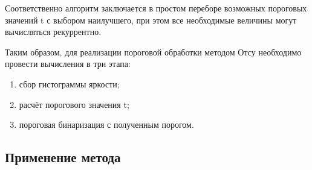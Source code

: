 \documentclass[12pt,a4paper]{extarticle} %
\begin{document}
    Соответственно алгоритм заключается в простом переборе возможных пороговых значений t с выбором наилучшего, при этом все необходимые величины могут вычисляться рекуррентно.

    Таким образом, для реализации пороговой обработки методом Отсу необходимо провести вычисления в три этапа:
\begin{enumerate}
    \item сбор гистограммы яркости;\\
    \item расчёт порогового значения t;\\
    \item пороговая бинаризация с полученным порогом.
\end{enumerate}

\newpage
\subsection{Применение метода}
\end{document}
